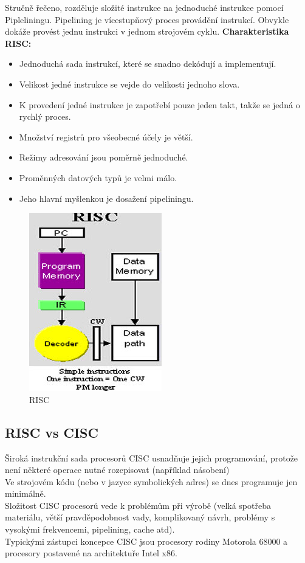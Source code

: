 Stručně řečeno, rozděluje složité instrukce na jednoduché instrukce pomocí Pipleliningu. Pipelining je vícestupňový proces provádění instrukcí. Obvykle dokáže provést jednu instrukci v jednom strojovém cyklu.
\textbf{Charakteristika RISC:}\\
\begin{itemize}
\item Jednoduchá sada instrukcí, které se snadno dekódují a implementují.
\item Velikost jedné instrukce se vejde do velikosti jednoho slova.
\item K provedení jedné instrukce je zapotřebí pouze jeden takt, takže se jedná o rychlý proces.
\item Množství registrů pro všeobecné účely je větší.
\item Režimy adresování jsou poměrně jednoduché.
\item Proměnných datových typů je velmi málo.
\item Jeho hlavní myšlenkou je dosažení pipeliningu.
\end{itemize}
    \begin{figure}[h]
   \begin{center}
     \includegraphics[scale=0.5]{images/RISC.png}
   \end{center}
   \caption{RISC}
  \end{figure}
  
\subsection{RISC vs CISC}
Široká instrukční sada procesorů CISC usnadňuje jejich
programování, protože není některé operace nutné rozepisovat (například násobení)\\
Ve strojovém kódu (nebo v jazyce symbolických adres) se dnes
programuje jen minimálně.\\
Složitost CISC procesorů vede k problémům při výrobě (velká spotřeba materiálu, větší pravděpodobnost vady, komplikovaný návrh, problémy s vysokými frekvencemi, pipelining, cache atd).\\
Typickými zástupci koncepce CISC jsou procesory rodiny Motorola 68000 a procesory postavené na architektuře Intel x86.\\

